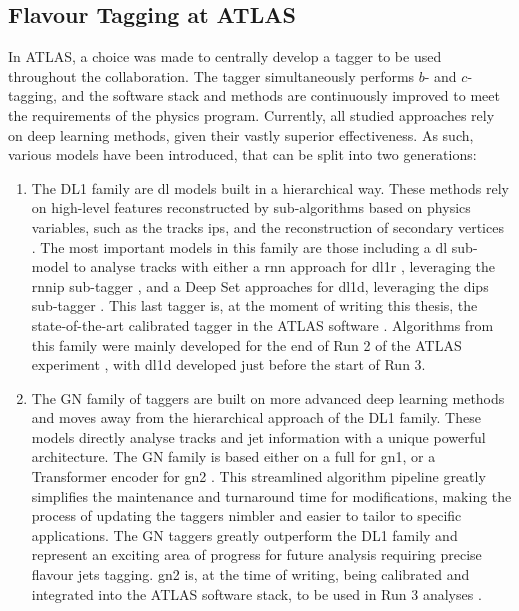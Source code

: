 \subsection{Flavour Tagging at ATLAS}
In ATLAS, a choice was made to centrally develop a tagger to be used throughout the collaboration. The tagger simultaneously performs $b$- and $c$-tagging, and the software stack and methods are continuously improved to meet the requirements of the physics program. Currently, all studied approaches rely on deep learning methods, given their vastly superior effectiveness. As such, various models have been introduced, that can be split into two generations: 
\begin{enumerate}
  \item The DL1 family are \gls{dl} models built in a hierarchical way. These methods rely on high-level features reconstructed by sub-algorithms based on physics variables, such as the tracks \glspl{ip}, and the reconstruction of secondary vertices \cite{ATL-PHYS-PUB-2015-022}. The most important models in this family are those including a \gls{dl} sub-model to analyse tracks with either a \gls{rnn} approach for \gls{dl1r} \cite{ATLAS:2017bcq}, leveraging the \gls{rnnip} sub-tagger \cite{ATL-PHYS-PUB-2017-003}, and a Deep Set approaches for \gls{dl1d}, leveraging the \gls{dips} sub-tagger \cite{ATL-PHYS-PUB-2020-014}. This last tagger is, at the moment of writing this thesis, the state-of-the-art calibrated tagger in the ATLAS software \cite{ATL-SOFT-PUB-2021-001}. Algorithms from this family were mainly developed for the end of Run 2 of the ATLAS experiment \cite{atlas:FTAGRUN2}, with \gls{dl1d} developed just before the start of Run 3.
  \item The GN family of taggers are built on more advanced deep learning methods and moves away from the hierarchical approach of the DL1 family. These models directly analyse tracks and jet information with a unique powerful architecture. The GN family is based either on a full  for \gls{gn1}, or a Transformer encoder for \gls{gn2} \cite{ATL-PHYS-PUB-2022-027, ATL-PLOT-FTAG-2023-01, duperrin2023flavour}. This streamlined algorithm pipeline greatly simplifies the maintenance and turnaround time for modifications, making the process of updating the taggers nimbler and easier to tailor to specific applications. The GN taggers greatly outperform the DL1 family and represent an exciting area of progress for future analysis requiring precise flavour jets tagging. \gls{gn2} is, at the time of writing, being calibrated and integrated into the ATLAS software stack, to be used in Run 3 analyses \cite{ATL-SOFT-PUB-2021-001}.  
\end{enumerate}

